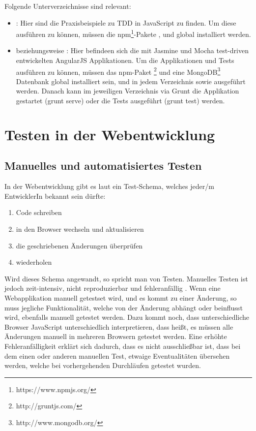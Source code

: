 Folgende Unterverzeichnisse sind relevant:
\begin{itemize}
  \item {}: Hier sind die Praxisbeispiele zu TDD in JavaScript zu finden. Um diese ausführen zu können, müssen die npm\footnote{https://www.npmjs.org/}-Pakete ,  und  global installiert werden.
  \item {} beziehungsweise : Hier befindeen sich die mit Jasmine und Mocha test-driven entwickelten AngularJS Applikationen. Um die Applikationen und Tests ausführen zu können, müssen das npm-Paket \footnote{http://gruntjs.com/} und eine MongoDB\footnote{http://www.mongodb.org/} Datenbank global installiert sein, und in jedem Verzeichnis  sowie  ausgeführt werden. Danach kann im jeweiligen Verzeichnis via Grunt die Applikation gestartet (grunt serve) oder die Tests ausgeführt (grunt test) werden.
\end{itemize}

\newpage

\section{Testen in der Webentwicklung}
\subsection{Manuelles und automatisiertes Testen}
In der Webentwicklung gibt es laut \cite[3]{Johansen:2011} ein Test-Schema, welches jeder/m EntwicklerIn bekannt sein dürfte:
\begin{enumerate}
  \item Code schreiben
  \item in den Browser wechseln und aktualisieren
  \item die geschriebenen Änderungen überprüfen
  \item wiederholen
\end{enumerate}
Wird dieses Schema angewandt, so spricht man von  Testen. Manuelles Testen ist jedoch zeit-intensiv, nicht reproduzierbar und fehleranfällig \autocite[3]{Johansen:2011}. Wenn eine Webapplikation manuell getestset wird, und es kommt zu einer Änderung, so muss jegliche Funktionalität, welche von der Änderung abhängt oder beinflusst wird, ebenfalls manuell getestet werden. Dazu kommt noch, dass unterschiedliche Browser JavaScript unterschiedlich interpretieren, dass heißt, es müssen alle Änderungen manuell in mehreren Browsern getestet werden. Eine erhöhte Fehleranfälligkeit erklärt sich dadurch, dass es nicht ausschließbar ist, dass bei dem einen oder anderen manuellen Test, etwaige Eventualitäten übersehen werden, welche bei vorhergehenden Durchläufen getestet wurden.

